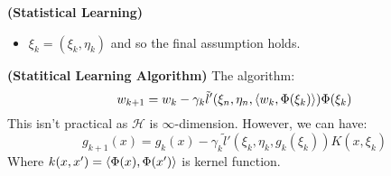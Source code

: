 \begin{definition}{\textbf{(Statistical Learning)}}
\begin{itemize}
\begin{equation*}
            \partial F(w, z) = \partial \underbrace{l(x, y, \brackd{w, \Phi(x)})}_{\subset \mathbb{R}}\underbrace{\Phi(x)}_{\in H} \subset H
        \end{equation*}
        as we have $\tilde{l}' : \mathcal{X}\times\mathcal{Y}\times \mathbb{R}\rightarrow \mathbb{R}$ or we have $\tilde{l}'(x, y, t)\in\partial l(x, y, t)$, thus we have:
        \begin{equation*}
            \tilde{\nabla}F(w, z) = \tilde{l}'(x, y, \brackd{w, \Phi(x)})\Phi(x) \in\partial F(w, z)
        \end{equation*}
        And so the third condition holds.
        \item $\xi_k = (\xi_k, \eta_k)$ and so the final assumption holds.
    \end{itemize}
\end{definition}

\begin{definition}{\textbf{(Statitical Learning Algorithm)}}
    The algorithm:
    \begin{equation*}
        w_{k+1} = w_k - \gamma_k\tilde{l}'(\xi_n, \eta_n, \left\langle w_k, \Phi(\xi_k) \right\rangle)\Phi(\xi_k)
    \end{equation*}
    This isn't practical as $\mathcal{H}$ is $\infty$-dimension. However, we can have:
    \begin{equation*}
        g_{k+1}(x) = g_k(x)-\gamma_k\tilde{l}'(\xi_k, \eta_k, g_k(\xi_k))K(x,\xi_k)
    \end{equation*}
    Where $k(x, x')=\left\langle \Phi(x), \Phi(x') \right\rangle$ is kernel function. 
\end{definition}

